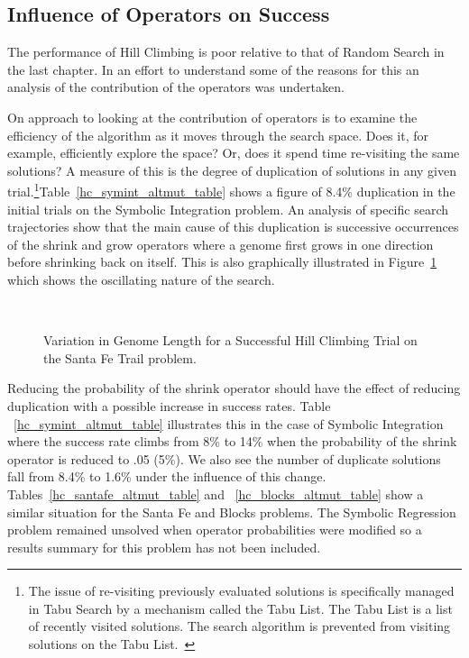 \subsection{Influence of Operators on Success}
\label{duplicate_solutions}The performance of Hill Climbing is poor relative to that of Random Search in the last chapter. In an effort to understand some of the reasons for this an analysis of the contribution of the operators was undertaken. 

On approach to looking at the contribution of operators is to examine the efficiency of the algorithm as it moves through the search space. Does it, for example, efficiently explore the space? Or, does it spend time re-visiting the same solutions? A measure of this is the degree of duplication of solutions in any given trial.\footnote{The issue of re-visiting previously evaluated solutions is specifically managed in Tabu Search by a mechanism called the Tabu List. The Tabu List is a list of recently visited solutions. The search algorithm is prevented from visiting solutions on the Tabu List.~\cite{tabu}}Table~\ref{hc_symint_altmut_table} shows a figure of 8.4\% duplication in the initial trials on the Symbolic Integration problem. An analysis of specific search trajectories show that the main cause of this duplication is successive occurrences of the shrink and grow operators where a genome first grows in one direction before shrinking back on itself.
This is also graphically illustrated in Figure~\ref{hc_length} which shows the oscillating nature of the search. 


\begin{figure}[]
\centerline{\hbox{
}}
\caption{\label{hc_length} Variation in Genome Length for a Successful Hill Climbing Trial on the Santa Fe Trail problem.}
\end{figure}

Reducing the probability of the shrink operator should have the effect of reducing duplication with a possible increase in success rates. Table ~\ref{hc_symint_altmut_table} illustrates this in the case of Symbolic Integration where the success rate climbs from 8\% to 14\% when the probability of the shrink operator is reduced to .05 (5\%). We also see the number of duplicate  solutions fall from 8.4\% to 1.6\% under the influence of this change. Tables~\ref{hc_santafe_altmut_table} and ~\ref{hc_blocks_altmut_table} show a similar situation for the Santa Fe and Blocks problems. The Symbolic Regression problem remained unsolved when operator probabilities were modified so a results summary for this problem has not been included.
  
